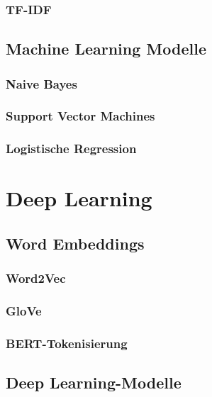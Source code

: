 \subsubsection{TF-IDF}


\subsection{Machine Learning Modelle}
\label{sec:ml_modelle}

\subsubsection{Naive Bayes}

\subsubsection{Support Vector Machines}

\subsubsection{Logistische Regression}


\section{Deep Learning}
\label{sec:deep_learning}

\subsection{Word Embeddings}
\label{sec:word_embeddings}

\subsubsection{Word2Vec}

\subsubsection{GloVe}

\subsubsection{BERT-Tokenisierung}


\subsection{Deep Learning-Modelle}
\label{sec:deep_learning_modelle}

